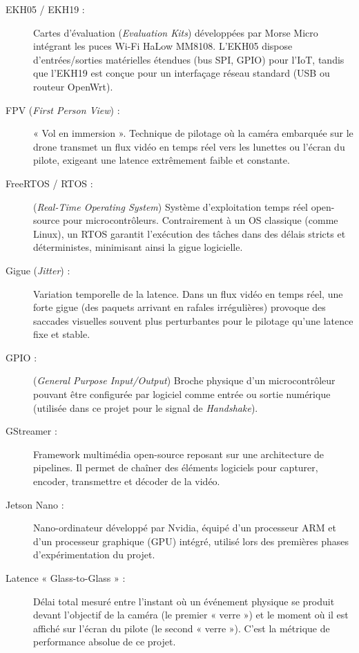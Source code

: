 \begin{description}
    \item[EKH05 / EKH19 :] Cartes d'évaluation (\textit{Evaluation Kits}) développées par Morse Micro intégrant 
    les puces Wi-Fi HaLow MM8108. L'EKH05 dispose d'entrées/sorties matérielles étendues (bus SPI, GPIO) pour 
    l'IoT, tandis que l'EKH19 est conçue pour un interfaçage réseau standard (USB ou routeur OpenWrt).
    
    \item[FPV (\textit{First Person View}) :] « Vol en immersion ». Technique de pilotage où la caméra embarquée 
    sur le drone transmet un flux vidéo en temps réel vers les lunettes ou l'écran du pilote, exigeant une latence 
    extrêmement faible et constante.
    
    \item[FreeRTOS / RTOS :] (\textit{Real-Time Operating System}) Système d'exploitation temps réel open-source 
    pour microcontrôleurs. Contrairement à un OS classique (comme Linux), un RTOS garantit l'exécution des tâches 
    dans des délais stricts et déterministes, minimisant ainsi la gigue logicielle.
    
    \item[Gigue (\textit{Jitter}) :] Variation temporelle de la latence. Dans un flux vidéo en temps réel, une 
    forte gigue (des paquets arrivant en rafales irrégulières) provoque des saccades visuelles souvent plus 
    perturbantes pour le pilotage qu'une latence fixe et stable.
    
    \item[GPIO :] (\textit{General Purpose Input/Output}) Broche physique d'un microcontrôleur pouvant être 
    configurée par logiciel comme entrée ou sortie numérique (utilisée dans ce projet pour le signal de 
    \textit{Handshake}).
    
    \item[GStreamer :] Framework multimédia open-source reposant sur une architecture de pipelines. Il 
    permet de chaîner des éléments logiciels pour capturer, encoder, transmettre et décoder de la vidéo.
    
    \item[Jetson Nano :] Nano-ordinateur développé par Nvidia, équipé d'un processeur ARM et d'un processeur 
    graphique (GPU) intégré, utilisé lors des premières phases d'expérimentation du projet.
    
    \item[Latence « Glass-to-Glass » :] Délai total mesuré entre l'instant où un événement physique se produit 
    devant l'objectif de la caméra (le premier « verre ») et le moment où il est affiché sur l'écran du pilote 
    (le second « verre »). C'est la métrique de performance absolue de ce projet.
    

\end{description}
